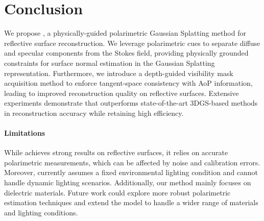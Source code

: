 \section{Conclusion}
\label{sec:conclusion}
We propose \polgs, a physically-guided polarimetric Gaussian Splatting method for reflective surface reconstruction. We leverage polarimetric cues to separate diffuse and specular components from the Stokes field, providing physically grounded constraints for surface normal estimation in the Gaussian Splatting representation. Furthermore, we introduce a depth-guided visibility mask acquisition method to enforce tangent-space consistency with AoP information, leading to improved reconstruction quality on reflective surfaces.
Extensive experiments demonstrate that \polgs outperforms state-of-the-art 3DGS-based methods in reconstruction accuracy while retaining high efficiency.

\paragraph{Limitations\quad} While \polgs achieves strong results on reflective surfaces, it relies on accurate polarimetric measurements, which can be affected by noise and calibration errors. 
Moreover, \polgs currently assumes a fixed environmental lighting condition and cannot handle dynamic lighting scenarios. 
Additionally, our method mainly focuses on dielectric materials. 
Future work could explore more robust polarimetric estimation techniques and extend the model to handle a wider range of materials and lighting conditions.








\newpage